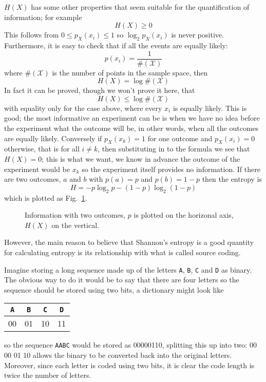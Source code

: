 \documentclass[12pt]{article}
\begin{document}
$H(X)$ has some other properties that seem suitable for the
quantification of information; for example
\begin{equation}
H(X)\ge 0
\end{equation}
This follows from $0\le p_X(x_i)\le 1$ so $\log_2{p_X(x_i)}$ is never
positive. Furthermore, it is easy to check that if all the events are equally likely:
\begin{equation}
p(x_i)=\frac{1}{\#(\mathcal{X})}
\end{equation}
where $\#(\mathcal{X})$ is the number of points in the sample space, then
\begin{equation}
H(X)=\log{\#(\mathcal{X})}
\end{equation}
In fact it can be proved, though we won't prove it here, that
\begin{equation}
H(X)\le \log{\#(\mathcal{X})}
\end{equation}
with equality only for the case above, where every $x_i$ is equally
likely. This is good; the most informative an experiment can be is
when we have no idea before the experiment what the outcome will be,
in other words, when all the outcomes are equally likely. Conversely
if $p_X(x_k)=1$ for one outcome and $p_X(x_i)=0$ otherwise, that is for
all $i\not=k$, then substituting in to the formula we see that
$H(X)=0$; this is what we want, we know in advance the outcome of the
experiment would be $x_k$ so the experiment itself provides no
information. If there are two outcomes, $a$ and $b$ with $p(a)=p$ and
$p(b)=1-p$ then the entropy is
\begin{equation}
H=-p\log_2{p}-(1-p)\log_2{(1-p)}
\end{equation}
which is plotted as Fig.~\ref{fig_two_outcomes}.

\begin{figure}
\begin{center}

\end{center}
\caption{Information with two outcomes, $p$ is plotted on the
  horizonal axis, $H(X)$ on the vertical.\label{fig_two_outcomes}}
\end{figure}

However, the main reason to believe that Shannon's entropy is a good
quantity for calculating entropy is its relationship with what is
called source coding. 

Imagine storing a long sequence made up of the letters \texttt{A}, \texttt{B}, \texttt{C} and \texttt{D}
as binary. The obvious way to do it would be to say that there are
four letters so the sequence should be stored using two bits, a
dictionary might look like
\begin{center}
\begin{tabular}{cccc}
\texttt{A}&\texttt{B}&\texttt{C}&\texttt{D}\\
\hline
00&01&10&11
\end{tabular}
\end{center}
so the sequence \texttt{AABC} would be stored as 00000110, splitting this up
into two: 00 00 01 10 allows the binary to be converted back into the
original letters. Moreover, since each letter is coded using two bits,
it is clear the code length is twice the number of letters. 
\end{document}
